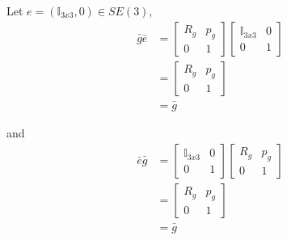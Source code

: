 \documentclass[12pt]{article}
\newcommand{\I}{\mathbb{I}}
\begin{document}
\begin{enumerate}
\begin{enumerate}
                        Let $e = (\I_{3x3}, 0) \in SE(3)$,
                        \begin{align}
                            \bar{g} \bar{e} &= \begin{bmatrix} 
                                            R_g & p_g \\ 
                                            0 & 1
                                        \end{bmatrix} 
                                        \begin{bmatrix} 
                                            \I_{3x3} & 0 \\ 
                                            0 & 1
                                        \end{bmatrix} \\
                                     &= \begin{bmatrix} 
                                            R_g & p_g \\ 
                                            0 & 1
                                        \end{bmatrix} \\
                                    &= \bar{g}
                        \end{align}
                    
                                    and
                        \begin{align}
                             \bar{e} \bar{g} &= \begin{bmatrix} 
                                            \I_{3x3} & 0 \\ 
                                            0 & 1
                                        \end{bmatrix}
                                        \begin{bmatrix} 
                                            R_g & p_g \\ 
                                            0 & 1
                                        \end{bmatrix} \\
                                     &= \begin{bmatrix} 
                                            R_g & p_g \\ 
                                            0 & 1
                                        \end{bmatrix} \\
                                    &= \bar{g} 
                        \end{align}
                        

\end{enumerate}
\end{enumerate}
\end{document}
